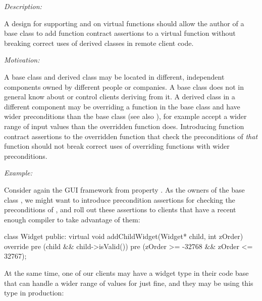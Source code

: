 
\emph{Description:}

A design for supporting  and  on virtual functions should allow the author of a base class to add function contract assertions to a virtual function without breaking correct uses of derived classes in remote client code.

\emph{Motivation:}

A base class and derived class may be located in different, independent components owned by different people or companies. A base class does not in general know about or control clients deriving from it. A derived class in a different component may be overriding a function in the base class and have wider preconditions than the base class (see also ), for example accept a wider range of input values than the overridden function does. Introducing function contract assertions to the overridden function that check the preconditions of \emph{that} function should not break correct uses of overriding functions with wider preconditions.



\emph{Example:}

Consider again the GUI framework from property . As the owners of the base class , we might want to introduce precondition assertions for checking the preconditions of \allowbreak{}, and roll out these assertions to clients that have a recent enough compiler to take advantage of them: 

\begin{codeblock}
class Widget {
public:
  virtual void addChildWidget(Widget* child, int zOrder) override
    pre (child && child->isValid())
    pre (zOrder >= -32768 && zOrder <= 32767);
}
\end{codeblock}

At the same time, one of our clients may have a widget type in their code base that can handle a wider range of values for  just fine, and they may be using this type in production:


